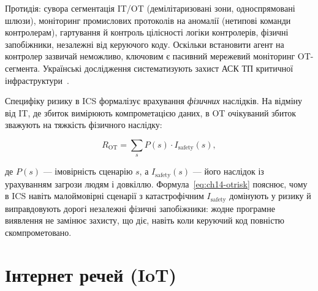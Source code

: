 Протидія: сувора сегментація IT/OT (демілітаризовані зони, односпрямовані шлюзи), моніторинг промислових протоколів на аномалії (нетипові команди контролерам), гартування й контроль цілісності логіки контролерів, фізичні запобіжники, незалежні від керуючого коду. Оскільки встановити агент на контролер зазвичай неможливо, ключовим є пасивний мережевий моніторинг OT-сегмента. Українські дослідження систематизують захист АСК ТП критичної інфраструктури~\cite{ch14:ics-ua}.

\begin{tikzfig}
\end{tikzfig}

Специфіку ризику в ICS формалізує врахування \emph{фізичних} наслідків. На відміну від IT, де збиток вимірюють компрометацією даних, в OT очікуваний збиток зважують на тяжкість фізичного наслідку:

\begin{equation}
R_{\text{OT}} = \sum_{s} P(s)\cdot I_{\text{safety}}(s),
\label{eq:ch14-otrisk}
\end{equation}

де $P(s)$ --- імовірність сценарію $s$, а $I_{\text{safety}}(s)$ --- його наслідок із урахуванням загрози людям і довкіллю. Формула~\eqref{eq:ch14-otrisk} пояснює, чому в ICS навіть малоймовірні сценарії з катастрофічним $I_{\text{safety}}$ домінують у ризику й виправдовують дорогі незалежні фізичні запобіжники: жодне програмне виявлення не замінює захисту, що діє, навіть коли керуючий код повністю скомпрометовано.

\section{Інтернет речей (IoT)}\label{sec:ch14-iot}


